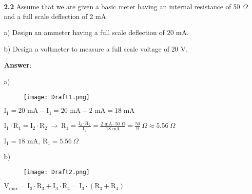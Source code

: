 \documentclass{article}
\begin{document}


\vspace{8mm}

{\textbf{2.2} Assume that we are given a basic meter having an internal resistance of 50 $\Omega$ and a full scale deflection of 2 mA}

{\quad a) Design an ammeter having a full scale deflection of 20 mA.}

{\quad b) Design a voltmeter to measure a full scale voltage of 20 V.}

\vspace{4mm}

{\textbf{Answer}:}

\vspace{4mm}

{a)}

\begin{figure}[H]
    \centering
    \texttt{[image: Draft1.png]}
\end{figure}

\vspace{4mm}

{$\text{I}_1 = 20\text{ mA} - \text{I}_1 = 20\text{ mA} - 2\text{ mA} = 18\text{ mA}$}

\vspace{4mm}

{$\displaystyle\text{I}_1\cdot\text{R}_1 = \text{I}_2\cdot\text{R}_2 \ \rightarrow \ \text{R}_1 = \frac{\text{I}_2\cdot\text{R}_2}{\text{I}_1} = \frac{2\text{ mA}\cdot\text{50 }\Omega}{18\text{ mA}} = \frac{50}{9}\ \Omega \approx 5.56 \ \Omega$}

\vspace{4mm}

{$\displaystyle \boxed{\text{I}_1 = 18 \text{ mA}, \ \text{R}_1 = 5.56\ \Omega}$}

\vspace{4mm}

\newpage

{b)}

\begin{figure}[H]
    \centering
    \texttt{[image: Draft2.png]}
\end{figure}

{$\displaystyle \text{V}_\text{max} = \text{I}_3\cdot {\text{R}_3} + \text{I}_3\cdot{\text{R}_4} = \text{I}_3\cdot ({\text{R}_3} + {\text{R}_4})$}
\end{document}
